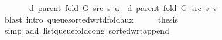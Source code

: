 \begin{isabellebody}
\ \ \ \ \ \ \ d\ {\isacharparenleft}{\kern0pt}parent\ {\isacharparenleft}{\kern0pt}fold\ G\ src\ s{\isacharparenright}{\kern0pt}{\isacharparenright}{\kern0pt}\ u\ {\isasymle}\ d\ {\isacharparenleft}{\kern0pt}parent\ {\isacharparenleft}{\kern0pt}fold\ G\ src\ s{\isacharparenright}{\kern0pt}{\isacharparenright}{\kern0pt}\ v{\isachardoublequoteclose}\isanewline
\ \ \ \ \isamarkupfalse%
\ {\isacharparenleft}{\kern0pt}blast\ intro{\isacharcolon}{\kern0pt}\ queue{\isacharunderscore}{\kern0pt}sorted{\isacharunderscore}{\kern0pt}wrt{\isacharunderscore}{\kern0pt}d{\isacharunderscore}{\kern0pt}fold{\isacharunderscore}{\kern0pt}aux{\isacharparenright}{\kern0pt}\isanewline
\ \ \isamarkupfalse%
\ \isamarkupfalse%
\ {\isacharquery}{\kern0pt}thesis\ \isanewline
\ \ \ \ \isamarkupfalse%
\ {\isacharparenleft}{\kern0pt}simp\ add{\isacharcolon}{\kern0pt}\ list{\isacharunderscore}{\kern0pt}queue{\isacharunderscore}{\kern0pt}fold{\isacharunderscore}{\kern0pt}cong\ sorted{\isacharunderscore}{\kern0pt}wrt{\isacharunderscore}{\kern0pt}append{\isacharparenright}{\kern0pt}\isanewline
{}\isamarkupfalse%
%
\endisatagproof
{\isafoldproof}%
%
\isadelimproof
%
\endisadelimproof
%
\begin{isamarkuptext}%

\end{isamarkuptext}
\end{isabellebody}
